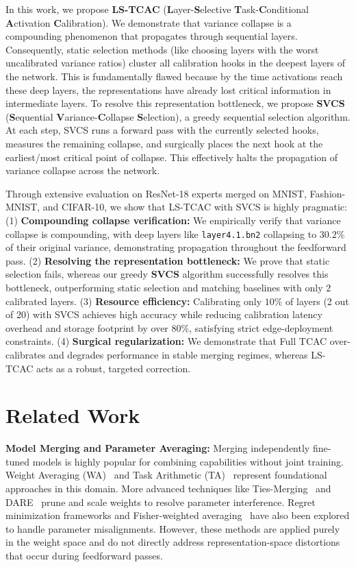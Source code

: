 \documentclass{article}
\theoremstyle{plain}
\theoremstyle{definition}
\theoremstyle{remark}
\begin{document}
In this work, we propose \textbf{LS-TCAC} (\textbf{L}ayer-\textbf{S}elective \textbf{T}ask-\textbf{C}onditional \textbf{A}ctivation \textbf{C}alibration). We demonstrate that variance collapse is a compounding phenomenon that propagates through sequential layers. Consequently, static selection methods (like choosing layers with the worst uncalibrated variance ratios) cluster all calibration hooks in the deepest layers of the network. This is fundamentally flawed because by the time activations reach these deep layers, the representations have already lost critical information in intermediate layers. To resolve this representation bottleneck, we propose \textbf{SVCS} (\textbf{S}equential \textbf{V}ariance-\textbf{C}ollapse \textbf{S}election), a greedy sequential selection algorithm. At each step, SVCS runs a forward pass with the currently selected hooks, measures the remaining collapse, and surgically places the next hook at the earliest/most critical point of collapse. This effectively halts the propagation of variance collapse across the network.

Through extensive evaluation on ResNet-18 experts merged on MNIST, Fashion-MNIST, and CIFAR-10, we show that LS-TCAC with SVCS is highly pragmatic:
(1) \textbf{Compounding collapse verification:} We empirically verify that variance collapse is compounding, with deep layers like \texttt{layer4.1.bn2} collapsing to $30.2\%$ of their original variance, demonstrating propagation throughout the feedforward pass.
(2) \textbf{Resolving the representation bottleneck:} We prove that static selection fails, whereas our greedy \textbf{SVCS} algorithm successfully resolves this bottleneck, outperforming static selection and matching baselines with only 2 calibrated layers.
(3) \textbf{Resource efficiency:} Calibrating only $10\%$ of layers (2 out of 20) with SVCS achieves high accuracy while reducing calibration latency overhead and storage footprint by over $80\%$, satisfying strict edge-deployment constraints.
(4) \textbf{Surgical regularization:} We demonstrate that Full TCAC over-calibrates and degrades performance in stable merging regimes, whereas LS-TCAC acts as a robust, targeted correction.

\section{Related Work}
\label{sec:related}
\textbf{Model Merging and Parameter Averaging:} Merging independently fine-tuned models is highly popular for combining capabilities without joint training. Weight Averaging (WA)~\cite{wortsman2022model} and Task Arithmetic (TA)~\cite{ilharco2022editing} represent foundational approaches in this domain. More advanced techniques like Ties-Merging~\cite{yadav2023resolving} and DARE~\cite{jin2023language} prune and scale weights to resolve parameter interference. Regret minimization frameworks and Fisher-weighted averaging~\cite{matena2022merging} have also been explored to handle parameter misalignments. However, these methods are applied purely in the weight space and do not directly address representation-space distortions that occur during feedforward passes.
\end{document}
